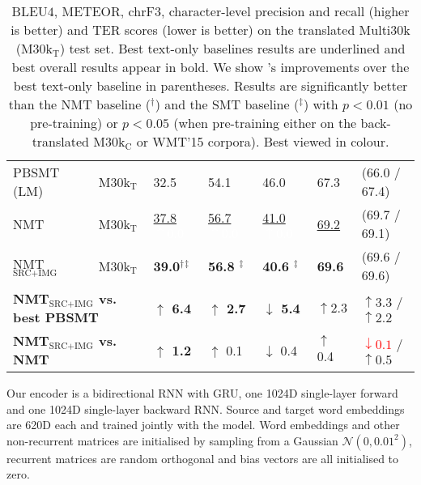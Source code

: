 \documentclass[11pt]{article}
\newcommand{\red}[1]{\textcolor{Red}{#1}}
\newcommand{\green}[1]{\textcolor{OliveGreen}{#1}}
\newcommand{\greenbf}[1]{\textbf{\textcolor{OliveGreen}{#1}}}
\newcommand{\whitebf}[1]{\textbf{\textcolor{White}{#1}}}
\begin{document}
\begin{table*}[t!]
{\begin{tabular}{lllllll}
PBSMT (LM) &
    M30k$_\text{T}$ &
    32.5 &
    54.1 &
    46.0 &
    67.3 &
    (66.0 / 67.4) \\


NMT &
    M30k$_\text{T}$ &
    \underline{37.8}\whitebf{$^\dagger$} {\small\whitebf{$\uparrow0.0$}} &
    \underline{56.7}\whitebf{$^\dagger$} {\small\whitebf{$\uparrow0.0$}} &
    \underline{41.0}\whitebf{$^\dagger$} {\small\whitebf{$\uparrow0.0$}} &
    \underline{69.2} &
    (69.7 / 69.1) \\


NMT$_{\text{SRC+IMG}}$ &
    M30k$_\text{T}$ &
    \textbf{39.0}$^\dagger$$^\ddagger$ &
    \textbf{56.8}\whitebf{$^\dagger$}$^\ddagger$ &
    \textbf{40.6}\whitebf{$^\dagger$}$^\ddagger$ &
    \textbf{69.6} &
    (69.6 / 69.6) \\
\midrule
    
    \multicolumn{2}{l}{\textbf{NMT$_{\text{SRC+IMG}}$ vs. best PBSMT}} &
    \greenbf{$\uparrow$ 6.4} &
    \greenbf{$\uparrow$ 2.7} &
    \greenbf{$\downarrow$ 5.4} &
    \greenbf{$\uparrow2.3$} &
    \greenbf{$\uparrow3.3$} / \green{$\uparrow2.2$} \\
    
    \multicolumn{2}{l}{\textbf{NMT$_{\text{SRC+IMG}}$ vs. NMT}} &
    \greenbf{$\uparrow$ 1.2} &
    \green{$\uparrow$ 0.1} &
    \green{$\downarrow$ 0.4} &
    \green{$\uparrow$ 0.4} &
    \red{$\downarrow0.1$} / \green{$\uparrow0.5$} \\
    \bottomrule
  \end{tabular}
  }
  
  \caption{BLEU$4$, METEOR, chrF3, character-level precision and recall (higher is better) and TER scores (lower is better) on the translated Multi30k (M30k$_\text{T}$) test set.
  Best text-only baselines results are underlined and best overall results appear in bold.
  We show 's improvements over the best text-only baseline in parentheses.
  Results are significantly better than the NMT baseline ($^\dagger$) and the SMT baseline ($^\ddagger$) with $p<0.01$ (no pre-training) or $p<0.05$ (when pre-training either on the back-translated M30k$_\text{C}$ or WMT'15 corpora). Best viewed in colour.
  }
  \label{tbl:results}
\end{table*}


Our encoder is a bidirectional RNN with GRU, one 1024D single-layer forward and one 1024D single-layer backward RNN.
Source and target word embeddings are 620D each and trained jointly with the model.
Word embeddings and other non-recurrent matrices are initialised by sampling from a Gaussian $\mathcal{N} (0, 0.01^2)$, recurrent matrices are random orthogonal and bias vectors are all initialised to zero.
\end{document}
